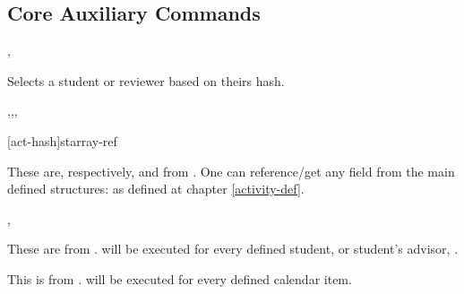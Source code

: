 \documentclass[article,nogeometry,english,tocdepth=3,secdepth=3]{ufrgscca} %
\begin{document}
\subsection{Core Auxiliary Commands}


\begin{codedescribe}[code,new=2023/11/18]{\studentselect,\studentReviewerSelect}
	\begin{codesyntax}%
	\end{codesyntax}
Selects a student or reviewer based on theirs hash.
\end{codedescribe}




\begin{codedescribe}[code,new=2023/11/18,update=2024/04/18]{\DataFields,\eDataSet,\eDataFields,\DataGet}
	\begin{codesyntax}%
    \tsmacro{\eDataSet}[act-hash]{starray-ref}
	\end{codesyntax}
These are, respectively,  and  from . One can reference/get any field from the main  defined structures:  as defined at chapter \ref{activity-def}.
\end{codedescribe}


\begin{codedescribe}[code,new=2023/11/18,update=2023/12/02]{\studentiterate,\studentadvisoriterate}
	\begin{codesyntax}%
	\end{codesyntax}
These are  from .  will be executed for every defined student, \tsobj{\studentiterate} or student's advisor, \tsobj{\studentadvisoriterate}.
\end{codedescribe}

\begin{codedescribe}[code,new=2023/11/29]{\ActivityCalendarIterate}
	\begin{codesyntax}%
	\end{codesyntax}
This is  from .  will be executed for every defined calendar item.
\end{codedescribe}
\end{document}
